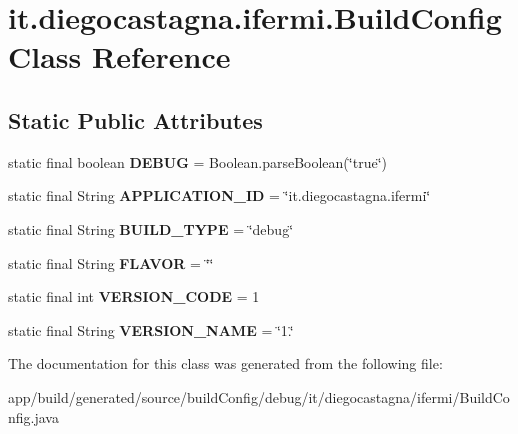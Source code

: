 \hypertarget{classit_1_1diegocastagna_1_1ifermi_1_1_build_config}{}\section{it.\+diegocastagna.\+ifermi.\+Build\+Config Class Reference}
\label{classit_1_1diegocastagna_1_1ifermi_1_1_build_config}
\subsection*{Static Public Attributes}
\begin{DoxyCompactItemize}
\item 
\mbox{\label{classit_1_1diegocastagna_1_1ifermi_1_1_build_config_a88516d7f6ec74c912943e3628c9a9577}} 
static final boolean {\bfseries D\+E\+B\+UG} = Boolean.\+parse\+Boolean(\char`\"{}true\char`\"{})
\item 
\mbox{\label{classit_1_1diegocastagna_1_1ifermi_1_1_build_config_a29fab2d1708820d9bd92c52f88bab0e7}} 
static final String {\bfseries A\+P\+P\+L\+I\+C\+A\+T\+I\+O\+N\+\_\+\+ID} = \char`\"{}it.\+diegocastagna.\+ifermi\char`\"{}
\item 
\mbox{\label{classit_1_1diegocastagna_1_1ifermi_1_1_build_config_a40fb7db46e3f5c8a7e6695eb27613e48}} 
static final String {\bfseries B\+U\+I\+L\+D\+\_\+\+T\+Y\+PE} = \char`\"{}debug\char`\"{}
\item 
\mbox{\label{classit_1_1diegocastagna_1_1ifermi_1_1_build_config_a6ab2784f6c4fafd403c78a8ca14ee6e5}} 
static final String {\bfseries F\+L\+A\+V\+OR} = \char`\"{}\char`\"{}
\item 
\mbox{\label{classit_1_1diegocastagna_1_1ifermi_1_1_build_config_a752ba3d4b4da8b3c2b5fe319dc0f7513}} 
static final int {\bfseries V\+E\+R\+S\+I\+O\+N\+\_\+\+C\+O\+DE} = 1
\item 
\mbox{\label{classit_1_1diegocastagna_1_1ifermi_1_1_build_config_a034c4d6b1e94544ab7875d7c902aac47}} 
static final String {\bfseries V\+E\+R\+S\+I\+O\+N\+\_\+\+N\+A\+ME} = \char`\"{}1.\char`\"{}
\end{DoxyCompactItemize}


The documentation for this class was generated from the following file\+:\begin{DoxyCompactItemize}
\item 
app/build/generated/source/build\+Config/debug/it/diegocastagna/ifermi/Build\+Config.\+java\end{DoxyCompactItemize}
